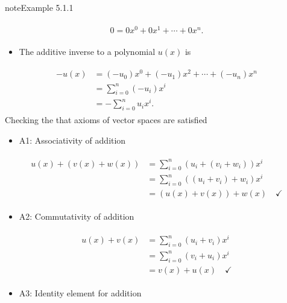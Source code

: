 \documentclass[letterpaper,10pt,english]{jupyterBook}
\begin{document}
\begin{sphinxadmonition}{note}{Example 5.1.1}
\begin{itemize}
\end{itemize}
\begin{equation*}
\begin{split} \begin{align*}
    0 = 0x^0 + 0x^1 + \cdots + 0x^n.
\end{align*} \end{split}
\end{equation*}\begin{itemize}
\item {} 
\sphinxAtStartPar
The additive inverse to a polynomial \(u(x)\) is

\end{itemize}
\begin{equation*}
\begin{split} \begin{align*}
    -u(x) &= (-u_0)x^0 + (-u_1)x^2 + \cdots + (-u_n)x^n \\
    &= \sum_{i=0}^n (-u_i)x^i \\
    &= -\sum_{i=0}^n u_ix^i.
\end{align*} \end{split}
\end{equation*}
\sphinxAtStartPar
Checking the that axioms of vector spaces are satisfied
\begin{itemize}
\item {} 
\sphinxAtStartPar
A1: Associativity of addition

\end{itemize}
\begin{equation*}
\begin{split} \begin{align*}
    u(x) + (v(x) + w(x)) &= \displaystyle \sum_{i=0}^n (u_i + (v_i + w_i))x^i \\
    &= \displaystyle \sum_{i=0}^n ((u_i + v_i) + w_i)x^i \\
    &= (u(x) + v(x)) + w(x) \quad \checkmark
\end{align*} \end{split}
\end{equation*}\begin{itemize}
\item {} 
\sphinxAtStartPar
A2: Commutativity of addition

\end{itemize}
\begin{equation*}
\begin{split} \begin{align*}
    u(x) + v(x) &= \displaystyle \sum_{i=0}^n (u_i + v_i)x^i \\
    &= \displaystyle \sum_{i=0}^n (v_i + u_i)x^i \\
    &= v(x) + u(x) \quad \checkmark
\end{align*} \end{split}
\end{equation*}\begin{itemize}
\item {} 
\sphinxAtStartPar
A3: Identity element for addition


\end{itemize}
\end{sphinxadmonition}
\end{document}
